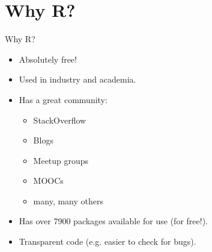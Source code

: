 \section{Why R?}
\begin{frame}
	\begin{center}
  		\begin{block}{Why R?} 
			\begin{itemize}
				\item Absolutely free!
				\item Used in industry and academia.
				\item Has a great community:
					\begin{itemize}
						\item StackOverflow
						\item Blogs
						\item Meetup groups
						\item MOOCs
						\item many, many others
					\end{itemize}
				\item Has over 7900 packages available for use (for free!).
				\item Transparent code (e.g. easier to check for bugs).
			\end{itemize}
		\end{block}
	\end{center} 
\end{frame}

